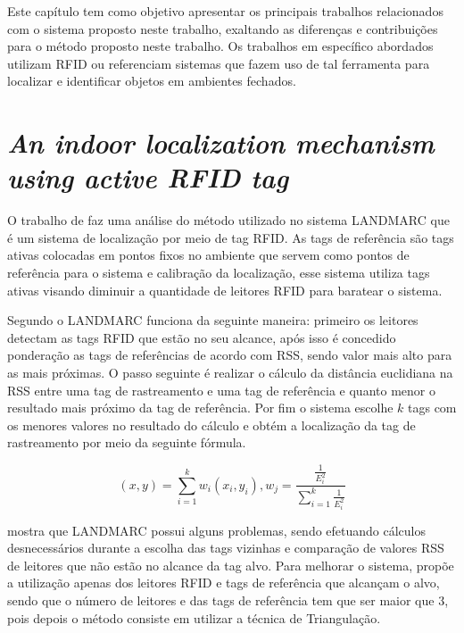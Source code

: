 
\label{chapter:correlatos}

Este capítulo tem como objetivo apresentar os principais trabalhos relacionados com o sistema proposto neste trabalho, 
exaltando as diferenças e contribuições para o método proposto neste trabalho. Os trabalhos em específico abordados 
utilizam RFID ou referenciam sistemas que fazem uso de tal ferramenta para localizar e identificar objetos em ambientes 
fechados.

%
%
\section{\textit{An indoor localization mechanism using active RFID tag}}

O trabalho de  faz uma análise do método utilizado no sistema LANDMARC 
que é um sistema de localização por meio de tag RFID. As tags de referência são tags ativas colocadas  em pontos fixos no ambiente
que servem como pontos de referência para o sistema e calibração da localização, esse sistema utiliza tags ativas visando 
diminuir a quantidade de leitores RFID para baratear o sistema.

Segundo  o LANDMARC funciona da seguinte maneira: primeiro os leitores detectam as tags RFID que estão 
no seu alcance, após isso é concedido ponderação as tags de referências de acordo com RSS, sendo valor mais alto para as mais 
próximas. O passo seguinte é realizar o cálculo da distância euclidiana na RSS entre uma tag de rastreamento e uma tag de 
referência e quanto menor o resultado mais próximo da tag de referência. Por fim o sistema escolhe $k$ tags com os menores valores no 
resultado do cálculo e obtém a localização da tag de rastreamento por meio da seguinte fórmula.

\begin{equation}
(x,y) = \sum^k_{i=1}w_i(x_i,y_i), w_j=\frac{\frac{1}{E_i^2}}{\sum_{i=1}^k\frac{1}{E^2_i}} 
\end{equation}


 mostra que LANDMARC possui alguns problemas, sendo efetuando cálculos desnecessários 
durante a escolha das tags vizinhas e comparação de valores RSS de leitores que não estão no alcance da tag alvo. 
Para melhorar o sistema,  propõe a utilização apenas dos leitores RFID  e tags de referência 
que alcançam o alvo, sendo que o número de leitores e das tags de referência tem que ser maior que 
$3$, pois depois o método consiste em utilizar a técnica de Triangulação.


